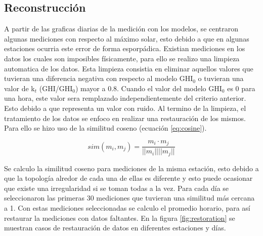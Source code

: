 \subsection{Reconstrucción}

A partir de las graficas diarias de la medición con los modelos, se centraron algunas mediciones con respecto al máximo solar, esto debido a que en algunas estaciones ocurria este error de forma esporpádica. Existian mediciones en los datos los cuales son imposibles físicamente, para ello se realizo una limpieza automatica de los datos. Esta limpieza consistia en eliminar aquellos valores que tuvieran una diferencia negativa con respecto al modelo GHI$_0$ o tuvieran una valor de k$_t$ (GHI/GHI$_0$) mayor a 0.8. Cuando el valor del modelo GHI$_0$ es 0 para una hora, este valor sera remplazado independientemente del criterio anterior. Esto debido a que representa un valor con ruido. Al termino de la limpieza, el tratamiento de los datos se enfoco en realizar una restauración de los mismos. Para ello se hizo uso de la similitud coseno (ecuación \ref{eq:cosine}).


\begin{equation}
	sim(m_i , m_j ) = \frac{m_i \cdot m_j}{||m_i|| ||m_j||}
	\label{eq:cosine}
\end{equation}

Se calculo la similitud coseno para mediciones de la misma estación, esto debido a que la topología alredor de cada una de ellas es diferente y esto puede ocasionar que existe una irregularidad si se toman todas a la vez. Para cada día se seleccionaron las primeras 30 mediciones que tuvieran una similitud más cercana a 1. Con estas mediciones seleccionadas se calculo el promedio horario, para así restaurar la mediciones con datos faltantes. En la figura \ref{fig:restoration} se muestran casos de restauración de datos en diferentes estaciones y días.

